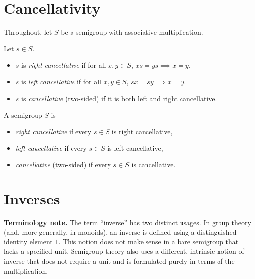 
\section{Cancellativity}

Throughout, let \(S\) be a semigroup with associative multiplication.

\begin{definition}
\label{def:cancellative-element}
\leanok
Let \(s\in S\).
\begin{itemize}
  \item \(s\) is \emph{right cancellative} if for all \(x,y\in S\), \(x s = y s \implies x = y\).
  \item \(s\) is \emph{left cancellative} if for all \(x,y\in S\), \(s x = s y \implies x = y\).
  \item \(s\) is \emph{cancellative} (two-sided) if it is both left and right cancellative.
\end{itemize}
\end{definition}

\begin{definition}
\label{def:cancellative-semigroup}
A semigroup \(S\) is
\begin{itemize}
  \item \emph{right cancellative} if every \(s\in S\) is right cancellative,
  \item \emph{left cancellative} if every \(s\in S\) is left cancellative,
  \item \emph{cancellative} (two-sided) if every \(s\in S\) is cancellative.
\end{itemize}
\end{definition}


\section{Inverses}

\noindent\textbf{Terminology note.}
The term “inverse” has two distinct usages. In group theory (and, more generally, in monoids), an inverse is defined using a distinguished identity element \(1\). This notion does not make sense in a bare semigroup that lacks a specified unit. Semigroup theory also uses a different, intrinsic notion of inverse that does not require a unit and is formulated purely in terms of the multiplication.

